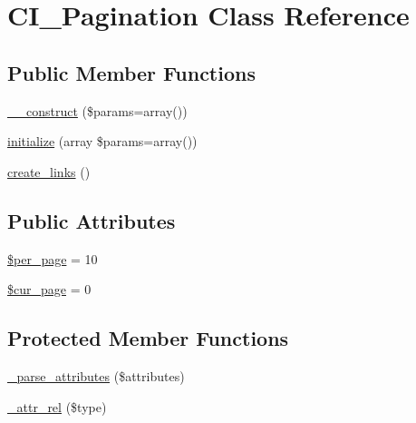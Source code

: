 \hypertarget{class_c_i___pagination}{}\section{C\+I\+\_\+\+Pagination Class Reference}
\label{class_c_i___pagination}
\subsection*{Public Member Functions}
\begin{DoxyCompactItemize}
\item 
\mbox{\hyperlink{class_c_i___pagination_a568ecdb0d73d2a870f33189739922a50}{\+\_\+\+\_\+construct}} (\$params=array())
\item 
\mbox{\hyperlink{class_c_i___pagination_a37ac2c18c8af8852be6947397aa92275}{initialize}} (array \$params=array())
\item 
\mbox{\hyperlink{class_c_i___pagination_afd580f4d296b1d416d2b4b03edef3bc5}{create\+\_\+links}} ()
\end{DoxyCompactItemize}
\subsection*{Public Attributes}
\begin{DoxyCompactItemize}
\item 
\mbox{\hyperlink{class_c_i___pagination_abece0f3099457a037f8f339811dc6e20}{\$per\+\_\+page}} = 10
\item 
\mbox{\hyperlink{class_c_i___pagination_a0114271d3cbbe963a73efe317e3512c7}{\$cur\+\_\+page}} = 0
\end{DoxyCompactItemize}
\subsection*{Protected Member Functions}
\begin{DoxyCompactItemize}
\item 
\mbox{\hyperlink{class_c_i___pagination_ac8d823533e1a045a789a197373fedf0b}{\+\_\+parse\+\_\+attributes}} (\$attributes)
\item 
\mbox{\hyperlink{class_c_i___pagination_a0ebda639ff890a52b36ca5eaf27275c0}{\+\_\+attr\+\_\+rel}} (\$type)
\end{DoxyCompactItemize}
